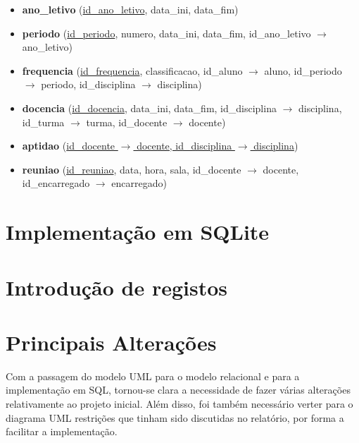 \documentclass[12pt,a4paper,reqno]{report}
\numberwithin{figure}{section}
\numberwithin{equation}{section}
\begin{document}
\begin{itemize}
\item \textbf{ano\_letivo} (\underline{id\_ano\_letivo}, data\_ini, data\_fim)

\item \textbf{periodo} (\underline{id\_periodo}, numero, data\_ini, data\_fim, id\_ano\_letivo $\rightarrow$ ano\_letivo)

\item \textbf{frequencia} (\underline{id\_frequencia}, classificacao, id\_aluno $\rightarrow$ aluno, id\_periodo $\rightarrow$ periodo, id\_disciplina $\rightarrow$ disciplina)

\item \textbf{docencia} (\underline{id\_docencia}, data\_ini, data\_fim, id\_disciplina $\rightarrow$ disciplina, id\_turma $\rightarrow$ turma, id\_docente $\rightarrow$ docente)

\item \textbf{aptidao} (\underline{id\_docente $\rightarrow$ docente, id\_disciplina $\rightarrow$ disciplina})

\item \textbf{reuniao} (\underline{id\_reuniao}, data, hora, sala, id\_docente $\rightarrow$ docente, id\_encarregado $\rightarrow$ encarregado)

\end{itemize}

\chapter{Implementação em SQLite}



\chapter{Introdução de registos}



\chapter{Principais Alterações}

Com a passagem do modelo UML para o modelo relacional e para a implementação em SQL, tornou-se clara a necessidade de fazer várias alterações relativamente ao projeto inicial. Além disso, foi também necessário verter para o diagrama UML restrições que tinham sido discutidas no relatório, por forma a facilitar a implementação.
\end{document}
